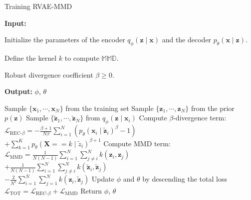 \documentclass{article}
\def\bx{\mathbf{x}}
\def\bX{\mathbf{X}}
\def\bz{\mathbf{z}}
\theoremstyle{plain}
\theoremstyle{definition}
\begin{document}
\begin{algorithm}[!h]
   \caption{Training RVAE-MMD}
   
   \textbf{Input:} 
   
	\hspace{\parindent} Initialize the parameters of the encoder $q_{\phi}(\bz \mid \bx)$ and the decoder $p_{\theta}(\bx \mid \bz)$.
	
	\hspace{\parindent} Define the kernel $k$ to compute $\mathbb{MMD}$.
	
	\hspace{\parindent} Robust divergence coefficient $\beta \geq 0$.

   \textbf{Output:} 
	\hspace{\parindent} $\phi$, $\theta$

\begin{algorithmic}[1]
   \STATE Sample $\{\bx_1, \cdots, \bx_N \}$ from the training set
   \STATE Sample $\{\bz_1, \cdots, \bz_N \}$ from the prior $p(\bz)$
   \STATE Sample $\{\tilde{\bz}_1, \cdots, \tilde{\bz}_N \}$ from $q_{\phi}(\bz \mid \bx_i)$
   \STATE Compute $\beta$-divergence term: \\\quad$\mathcal{L}_{\textrm{REC-}\beta} = - \frac{\beta+1}{N \beta} \sum_{i=1}^N \left( p_{\theta}(\bx_i \mid \tilde{\bz}_i)^{\beta} - 1 \right)$ \\  \quad \quad  \quad \quad \quad $+ \sum_{k=1}^K p_{\theta}(\bX == k \mid \tilde{z}_i)^{\beta+1}$
   \STATE Compute MMD term: \\\quad $\mathcal{L}_{\textrm{MMD}} = \frac{1}{N(N-1)} \sum_{i=1}^N \sum_{j \neq i}^N k(\bz_i, \bz_j)$\\  \quad \quad  \quad \quad \quad $+\frac{1}{N(N-1)} \sum_{i=1}^N \sum_{j \neq i}^N k(\tilde{\bz}_i, \tilde{\bz}_j)$ \\  \quad \quad  \quad \quad \quad  $- \frac{2}{N^2}  \sum_{i=1}^N   \sum_{j=1}^N  k(\bz_i, \tilde{\bz}_j)$
   \STATE Update $\phi$ and $\theta$ by descending the total loss \\\quad $\mathcal{L}_{\textrm{TOT}} = \mathcal{L}_{\textrm{REC-}\beta} + \mathcal{L}_{\textrm{MMD}} $
   \ENDWHILE
   \STATE Return $\phi$, $\theta$
\end{algorithmic}
\label{alg:rvae_mmd}
\end{algorithm}
\end{document}
